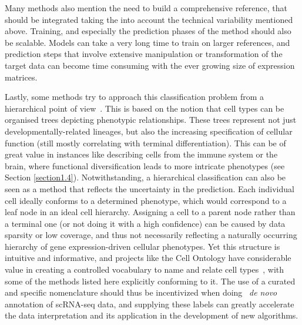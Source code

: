 Many methods also mention the need to build a comprehensive reference, that should be integrated taking the into account the technical variability mentioned above. Training, and especially the prediction phases of the method should also be scalable. Models can take a very long time to train on larger references, and prediction steps that involve extensive manipulation or transformation of the target data can become time consuming with the ever growing size of expression matrices. 

Lastly, some methods try to approach this classification problem from a hierarchical point of view~\citep{wagner_moana:_2018,pliner_supervised_2019,lin_scclassify:_2019}. This is based on the notion that cell types can be organised trees depicting phenotypic relationships. These trees represent not just developmentally-related lineages, but also the increasing specification of cellular function (still mostly correlating with terminal differentiation). This can be of great value in instances like describing cells from the immune system or the brain, where functional diversification leads to more intricate phenotypes (see Section \ref{section1.4}). Notwithstanding, a hierarchical classification can also be seen as a method that reflects the uncertainty in the prediction. Each individual cell ideally conforms to a determined phenotype, which would correspond to a leaf node in an ideal cell hierarchy. Assigning a cell to a parent node rather than a terminal one (or not doing it with a high confidence) can be caused by data sparsity or low coverage, and thus not necessarily reflecting a naturally occurring hierarchy of gene expression-driven cellular phenotypes. Yet this structure is intuitive and informative, and projects like the Cell Ontology have considerable value in creating a controlled vocabulary to name and relate cell types~\citep{bard_ontology_2005}, with some of the methods listed here explicitly conforming to it. The use of a curated and specific nomenclature should thus be incentivized when doing ~\textit{de novo} annotation of scRNA-seq data, and supplying these labels can greatly accelerate the data interpretation and its application in the development of new algorithms.


